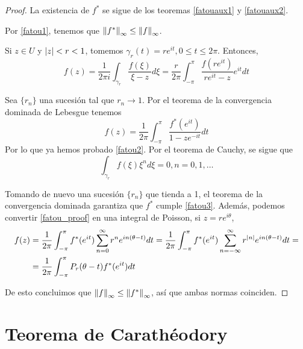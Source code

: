 \begin{proof}
    La existencia de $f^*$ se sigue de los teoremas \ref{fatouaux1} y \ref{fatouaux2}.

    Por \ref{fatou1}, tenemos que $\left\lVert f^*\right\rVert_{\infty} \leq \left\lVert f\right\rVert_{\infty}$.

    Si $z \in U$ y $\left\lvert z\right\rvert < r < 1$, tomemos $\gamma_r(t) = r e^{it}, 0 \leq t \leq 2\pi$. Entonces,
    \begin{equation*}
        f(z) = \dfrac{1}{2 \pi i} \int_{\gamma_r} \dfrac{f(\xi)}{\xi - z} d\xi =
        \dfrac{r}{2 \pi} \int_{-\pi}^{\pi} \dfrac{f(re^{it})}{re^{it} - z}e^{it} dt
    \end{equation*}

    Sea $\{r_n\}$ una sucesión tal que $r_n \rightarrow 1$. Por el teorema de la convergencia dominada de Lebesgue tenemos %
    \begin{equation}
        \label{fatou_proof}
        f(z) = \dfrac{1}{2 \pi} \int_{-\pi}^{\pi} \dfrac{f^* (e^{it})}{1 - ze^{-it}} dt
    \end{equation}
    Por lo que ya hemos probado \ref{fatou2}. Por el teorema de Cauchy, se sigue que
    \begin{equation*}
        \int_{\gamma_r} f(\xi)\xi^n d\xi = 0, n = 0, 1, \dots
    \end{equation*}

    Tomando de nuevo una sucesión $\{r_n\}$ que tienda a 1, el teorema de la convergencia dominada garantiza que $f^*$ cumple \ref{fatou3}. Además, podemos convertir \ref{fatou_proof} en una integral de Poisson, si $z = re^{i \theta}$,
    \begin{equation*}
         \begin{split}
             f(z) &  = \dfrac{1}{2 \pi} \int_{- \pi}^{\pi} f^*(e^{it}) \sum_{n=0}^{\infty} r^n e^{in(\theta - t)} dt =  \dfrac{1}{2 \pi} \int_{- \pi}^{\pi} f^*(e^{it}) \sum_{n=-\infty}^{\infty} r^{\left\lvert n\right\rvert} e^{in(\theta - t)} dt = \\
                  & =  \dfrac{1}{2 \pi} \int_{- \pi}^{\pi} P_r(\theta - t) f^*(e^{it}) dt
         \end{split}
    \end{equation*}

    De esto concluimos que $\left\lVert f\right\rVert_{\infty} \leq \left\lVert f^*\right\rVert_{\infty}$, así que ambas normas coinciden.
\end{proof}

\section{Teorema de Carathéodory}

